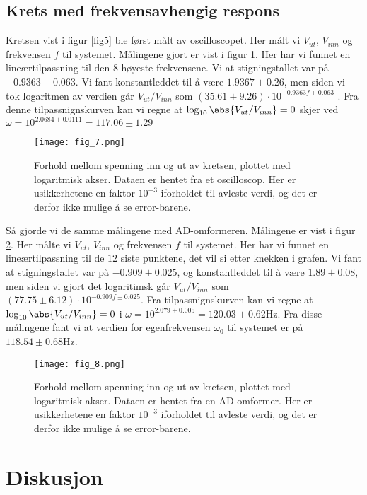 \documentclass[%
 reprint,
 amsmath,amssymb,
 aps,
]{revtex4-1}
\begin{document}
\subsection{Krets med frekvensavhengig respons}
Kretsen vist i figur \ref{fig5} ble først målt av oscilloscopet. Her målt vi $V_{ut}$, $V_{inn}$ og frekvensen $f$ til systemet. Målingene gjort er vist i figur \ref{fig7}. Her har vi funnet en lineærtilpassning til den $8$ høyeste frekvensene. Vi at stigningstallet var på $ -0.9363 \pm 0.063$. Vi fant konstantleddet til å være $1.9367 \pm  0.26$, men siden vi tok logaritmen av verdien går $V_{ut}/V_{inn}$ som $(35.61 \pm 9.26) \cdot 10^{-0.9363f \pm 0.063}$ . Fra denne tilpassnignskurven kan vi regne at $\log_{10} \abs{{V_{ut}/V_{inn}}} = 0$
skjer ved $\omega = 10^{2.0684 \pm 0.0111} = 117.06 \pm 1.29$
\begin{figure}[h!]
  \centering
  \texttt{[image: fig\_7.png]}
  \caption{Forhold mellom spenning inn og ut av kretsen, plottet med logaritmisk akser. Dataen er hentet fra et oscilloscop. Her er usikkerhetene en faktor $10^{-3}$ iforholdet til avleste verdi, og det er derfor ikke mulige å se error-barene.}
  \label{fig7}
\end{figure}
Så gjorde vi de samme målingene med AD-omformeren. Målingene er vist i figur \ref{fig8}. Her målte vi $V_{ut}$, $V_{inn}$ og frekvensen $f$ til systemet. Her har vi funnet en lineærtilpassning til de $12$ siste punktene, det vil si etter knekken i grafen. Vi fant at stigningstallet var på $ -0.909 \pm 0.025$, og konstantleddet til å være $1.89 \pm  0.08$, men siden vi gjort det logaritimsk går $V_{ut}/V_{inn}$ som$ (77.75 \pm 6.12) \cdot 10^{-0.909f \pm 0.025}$.
Fra tilpassnignskurven kan vi regne at $\log_{10} \abs{{V_{ut}/V_{inn}}} = 0$ i $\omega = 10^{2.079 \pm 0.005} = 120.03 \pm 0.62$Hz.
Fra disse målingene fant vi at verdien for egenfrekvensen $\omega_0$ til systemet er på $118.54 \pm  0.68$Hz.
\begin{figure}[h!]
  \centering
  \texttt{[image: fig\_8.png]}
  \caption{Forhold mellom spenning inn og ut av kretsen, plottet med logaritmisk akser. Dataen er hentet fra en AD-omformer. Her er usikkerhetene en faktor $10^{-3}$ iforholdet til avleste verdi, og det er derfor ikke mulige å se error-barene.}
  \label{fig8}
\end{figure}
\section{Diskusjon}
\end{document}
